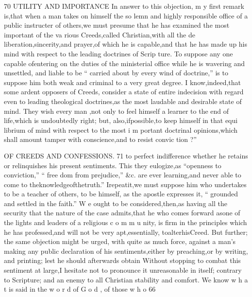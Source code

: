 \documentclass[
]{book}
\begin{document}
70 UTILITY AND IMPORTANCE
In answer to this objection, m y first remark
is,that when a man takes on himself the so
lemn and highly responsible office of a public
instructer of others,we must presume that he
has examined the most important of the va
rious Creeds,called Christian,with all the de
liberation,sincerity,and prayer,of which he
is capable,and that he has made up his mind
with respect to the leading doctrines of Scrip
ture. To suppose any one capable ofentering on the duties of the ministerial office while he
is wavering and unsettled, and liable to be
`` carried about by every wind of doctrine,'' is to suppose him both weak and criminal to a
very great degree. I know,indeed,that some ardent opposers of Creeds, consider a state of entire indecision with regard even to leading theological doctrines,as the most laudable and desirable state of mind. They wish every man ,not only to feel himself a learner to the end of life,which is undoubtedly right; but,
also,ifpossible,to keep himself in that equi librium of mind with respect to the most i m
portant doctrinal opinions,which shall amount
tamper with conscience,and to resist convic tion ?''

OF CREEDS AND CONFESSIONS. 71
to perfect indifference whether he retains or relinquishes his present sentiments. This they eulogize,as ``openness to conviction,'' `` free
dom from prejudice,'' \&c.
are
ever learning,and never able to come to theknowledgeofthetruth.'' Irepeatit,we must suppose him who undertakes to be a teacher of others, to be himself, as the apostle expresses it, `` grounded and settled in the faith.'' W e ought to be considered,then,as having all the security that the nature of the
case admits,that he who comes forward asone of the lights and leaders of a religious c o m m u nity, is firm in the principles which he has professed,and will not be very apt,essentially, toalterhisCreed.
But further; the same objection might be urged, with quite as much force, against a man's making any public declaration of his sentiments,either by preaching,or by writing, and printing; lest he should afterwards obtain
Without stopping to combat this sentiment at large,I hesitate
not to pronounce it unreasonable
in itself;
contrary to Scripture; and an enemy to all
Christian stability and comfort. We know w h a t is said in the w o r d of G o d , of those w h o
66
\end{document}
